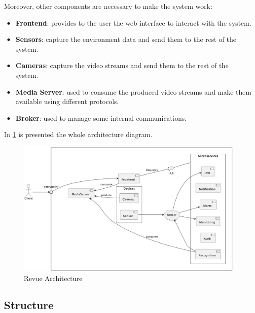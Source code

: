 \documentclass{scrartcl}
\begin{document}
    Moreover, other components are necessary to make the system work:

    \begin{itemize}
        \item \textbf{Frontend}: provides to the user the web interface to interact with the system.
        \item \textbf{Sensors}: capture the environment data and send them to the rest of the system.
        \item \textbf{Cameras}: capture the video streams and send them to the rest of the system.
        \item \textbf{Media Server}: used to consume the produced video streams and make them available using different protocols.
        \item \textbf{Broker}: used to manage some internal communications.
    \end{itemize}

    In \cref{fig:architecture} is presented the whole architecture diagram.

    \begin{figure}
        \centering
        \includegraphics[scale=0.51]{img/architecture}
        \caption{Revue Architecture}
        \label{fig:architecture}
    \end{figure}


    \subsection{Structure}

%
\end{document}
